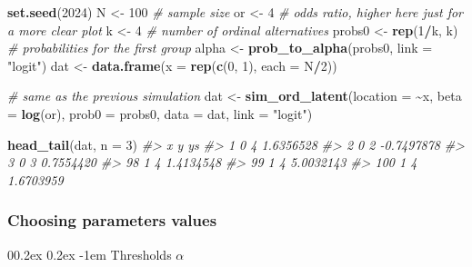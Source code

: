 \documentclass[
  man, mask,floatsintext]{apa6}
\makeatletter
\newenvironment{Shaded}{\begin{snugshade}}{\end{snugshade}}
\newcommand{\AttributeTok}[1]{\textcolor[rgb]{0.13,0.29,0.53}{#1}}
\newcommand{\CommentTok}[1]{\textcolor[rgb]{0.56,0.35,0.01}{\textit{#1}}}
\newcommand{\DecValTok}[1]{\textcolor[rgb]{0.00,0.00,0.81}{#1}}
\newcommand{\FunctionTok}[1]{\textcolor[rgb]{0.13,0.29,0.53}{\textbf{#1}}}
\newcommand{\NormalTok}[1]{#1}
\newcommand{\OtherTok}[1]{\textcolor[rgb]{0.56,0.35,0.01}{#1}}
\newcommand{\SpecialCharTok}[1]{\textcolor[rgb]{0.81,0.36,0.00}{\textbf{#1}}}
\newcommand{\StringTok}[1]{\textcolor[rgb]{0.31,0.60,0.02}{#1}}
\let\oldparagraph\paragraph
\renewcommand{\paragraph}[1]{\oldparagraph{#1}\mbox{}}
\renewcommand{\paragraph}{\@startsection{paragraph}{4}{\parindent}%
  {0\baselineskip \@plus 0.2ex \@minus 0.2ex}%
  {-1em}%
  {\normalfont\normalsize\bfseries\itshape\typesectitle}}
\makeatother
\begin{document}
\scriptsize

\begin{Shaded}
\begin{Highlighting}[]
\FunctionTok{set.seed}\NormalTok{(}\DecValTok{2024}\NormalTok{)}
\NormalTok{N }\OtherTok{\textless{}{-}} \DecValTok{100} \CommentTok{\# sample size}
\NormalTok{or }\OtherTok{\textless{}{-}} \DecValTok{4} \CommentTok{\# odds ratio, higher here just for a more clear plot}
\NormalTok{k }\OtherTok{\textless{}{-}} \DecValTok{4} \CommentTok{\# number of ordinal alternatives}
\NormalTok{probs0 }\OtherTok{\textless{}{-}} \FunctionTok{rep}\NormalTok{(}\DecValTok{1}\SpecialCharTok{/}\NormalTok{k, k) }\CommentTok{\# probabilities for the first group}
\NormalTok{alpha }\OtherTok{\textless{}{-}} \FunctionTok{prob\_to\_alpha}\NormalTok{(probs0, }\AttributeTok{link =} \StringTok{"logit"}\NormalTok{)}
\NormalTok{dat }\OtherTok{\textless{}{-}} \FunctionTok{data.frame}\NormalTok{(}\AttributeTok{x =} \FunctionTok{rep}\NormalTok{(}\FunctionTok{c}\NormalTok{(}\DecValTok{0}\NormalTok{, }\DecValTok{1}\NormalTok{), }\AttributeTok{each =}\NormalTok{ N}\SpecialCharTok{/}\DecValTok{2}\NormalTok{))}

\CommentTok{\# same as the previous simulation}
\NormalTok{dat }\OtherTok{\textless{}{-}} \FunctionTok{sim\_ord\_latent}\NormalTok{(}\AttributeTok{location =} \SpecialCharTok{\textasciitilde{}}\NormalTok{x, }\AttributeTok{beta =} \FunctionTok{log}\NormalTok{(or), }\AttributeTok{prob0 =}\NormalTok{ probs0, }\AttributeTok{data =}\NormalTok{ dat, }\AttributeTok{link =} \StringTok{"logit"}\NormalTok{)}

\FunctionTok{head\_tail}\NormalTok{(dat, }\AttributeTok{n =} \DecValTok{3}\NormalTok{)}
\CommentTok{\#\textgreater{}     x y         ys}
\CommentTok{\#\textgreater{} 1   0 4  1.6356528}
\CommentTok{\#\textgreater{} 2   0 2 {-}0.7497878}
\CommentTok{\#\textgreater{} 3   0 3  0.7554420}
\CommentTok{\#\textgreater{} 98  1 4  1.4134548}
\CommentTok{\#\textgreater{} 99  1 4  5.0032143}
\CommentTok{\#\textgreater{} 100 1 4  1.6703959}
\end{Highlighting}
\end{Shaded}

\normalsize

\subsubsection{Choosing parameters values}\label{choosing-parameters-values}

\paragraph{\texorpdfstring{Thresholds \(\alpha\)}{Thresholds \textbackslash alpha}}\label{thresholds-alpha}
\end{document}
